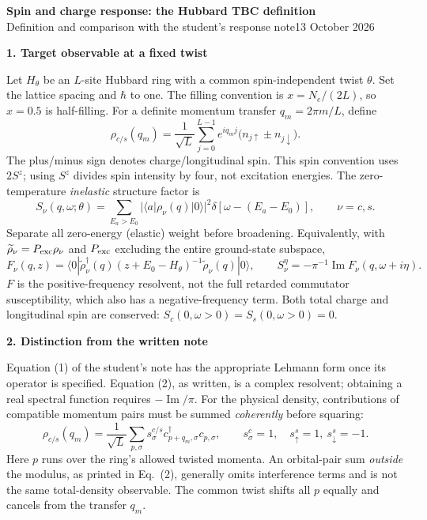 \documentclass[10pt,letterpaper]{article}
\newcommand{\lead}[1]{\par\smallskip\textbf{#1}\par\nobreak}
\begin{document}
\begin{center}
{\Large\bfseries Spin and charge response: the Hubbard TBC definition}\\[3pt]
{\small Definition and comparison with the student's response note\hfill 13 October 2026}
\end{center}
\vspace{-6pt}

\lead{1. Target observable at a fixed twist}
Let $H_\theta$ be an $L$-site Hubbard ring with a common spin-independent twist
$\theta$. Set the lattice spacing and $\hbar$ to one. The filling convention is
$x=N_e/(2L)$, so $x=0.5$ is half-filling. For a definite momentum transfer
$q_m=2\pi m/L$, define
\begin{equation}
 \rho_{c/s}(q_m)=\frac{1}{\sqrt L}\sum_{j=0}^{L-1}e^{iq_mj}
                  \bigl(n_{j\uparrow}\pm n_{j\downarrow}\bigr).
 \label{eq:rho}
\end{equation}
The plus/minus sign denotes charge/longitudinal spin. This spin convention uses
$2S^z$; using $S^z$ divides spin intensity by four, not excitation energies.
The zero-temperature \emph{inelastic} structure factor is
\begin{equation}
 S_\nu(q,\omega;\theta)=\sum_{E_a>E_0}
 |\langle a|\rho_\nu(q)|0\rangle|^2
 \delta\!\left[\omega-(E_a-E_0)\right],\qquad \nu=c,s.
 \label{eq:lehmann}
\end{equation}
Separate all zero-energy (elastic) weight before broadening. Equivalently, with
$\widetilde\rho_\nu=P_{\rm exc}\rho_\nu$ and $P_{\rm exc}$ excluding the entire
ground-state subspace,
\begin{equation}
 F_\nu(q,z)=\langle0|\widetilde\rho_\nu^\dagger(q)
 (z+E_0-H_\theta)^{-1}\widetilde\rho_\nu(q)|0\rangle,
 \qquad S_\nu^\eta=-\pi^{-1}\operatorname{Im}F_\nu(q,\omega+i\eta).
\end{equation}
$F$ is the positive-frequency resolvent, not the full retarded commutator
susceptibility, which also has a negative-frequency term. Both total charge and
longitudinal spin are conserved: $S_c(0,\omega>0)=S_s(0,\omega>0)=0$.

\lead{2. Distinction from the written note}
Equation (1) of the student's note has the appropriate Lehmann form once its
operator is specified. Equation (2), as written, is a complex resolvent;
obtaining a real spectral function requires $-\operatorname{Im}/\pi$.
For the physical density, contributions of compatible momentum pairs must be
summed \emph{coherently} before squaring:
\begin{equation}
 \rho_{c/s}(q_m)=\frac{1}{\sqrt L}\sum_{p,\sigma}s_\sigma^{c/s}
 c^\dagger_{p+q_m,\sigma}c_{p,\sigma},\qquad
 s_\sigma^c=1,\quad s_\uparrow^s=1,\ s_\downarrow^s=-1.
\end{equation}
Here $p$ runs over the ring's allowed twisted momenta. An orbital-pair sum
\emph{outside} the modulus, as printed in Eq.~(2), generally omits interference
terms and is not the same total-density observable. The common twist shifts
all $p$ equally and cancels from the transfer $q_m$.
\end{document}
